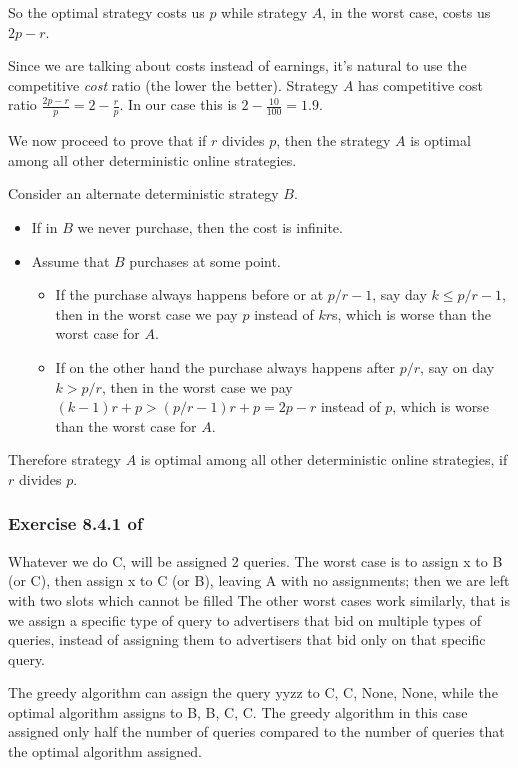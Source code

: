 \documentclass{article}
\begin{document}
So the optimal strategy costs us \(p\) while strategy \(A\),
in the worst case, costs us \(2p - r\).

Since we are talking about costs instead of earnings,
it's natural to use the competitive \emph{cost} ratio (the lower the better).
Strategy \(A\) has competitive cost ratio \(\frac{2p-r}{p} = 2 - \frac{r}{p}\).
In our case this is \(2 - \frac{10}{100} = 1.9\).

We now proceed to prove that
if \(r\) divides \(p\), then the strategy \(A\) is optimal
among all other deterministic online strategies.

Consider an alternate deterministic strategy \(B\).
\begin{itemize}
    \item If in \(B\) we never purchase,
        then the cost is infinite.
    \item Assume that \(B\) purchases at some point.
        \begin{itemize}
            \item If the purchase always happens before or at
                \(p/r - 1\), say day \(k \leq p/r - 1\),
                then in the worst case we pay
                \(p\) instead of \(kr\)s,
                which is worse than the worst case for \(A\).
            \item If on the other hand the purchase always happens after
                \(p/r\), say on day \(k > p/r\),
                then in the worst case we pay
                \((k-1)r + p > (p/r - 1)r + p = 2p - r \) instead of \(p\),
                which is worse than the worst case for \(A\).
        \end{itemize}
\end{itemize}

Therefore strategy \(A\) is optimal among all other
deterministic online strategies, if \(r\) divides \(p\).


\subsubsection*{Exercise 8.4.1 of \cite{mmds}}
 
Whatever we do C, will be assigned 2 queries.
The worst case is to assign x to B (or C), then assign x to C (or B),
leaving A with no assignments;
then we are left with two slots which cannot be filled
The other worst cases work similarly,
that is we assign a specific type of query
to advertisers that bid on multiple types of queries,
instead of assigning them to advertisers that bid only on that specific query.

The greedy algorithm can assign the query yyzz to C, C, None, None,
while the optimal algorithm assigns to B, B, C, C.
The greedy algorithm in this case assigned only half the number of queries
compared to the number of queries that the optimal algorithm assigned.





\end{document}
